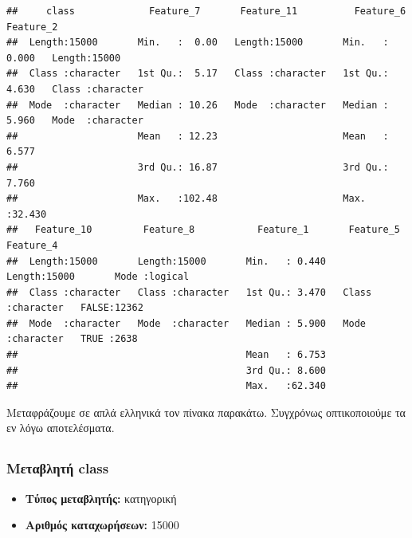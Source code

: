 \documentclass[
]{article}
\begin{document}
\begin{verbatim}
##     class             Feature_7       Feature_11          Feature_6       Feature_2        
##  Length:15000       Min.   :  0.00   Length:15000       Min.   : 0.000   Length:15000      
##  Class :character   1st Qu.:  5.17   Class :character   1st Qu.: 4.630   Class :character  
##  Mode  :character   Median : 10.26   Mode  :character   Median : 5.960   Mode  :character  
##                     Mean   : 12.23                      Mean   : 6.577                     
##                     3rd Qu.: 16.87                      3rd Qu.: 7.760                     
##                     Max.   :102.48                      Max.   :32.430                     
##   Feature_10         Feature_8           Feature_1       Feature_5         Feature_4      
##  Length:15000       Length:15000       Min.   : 0.440   Length:15000       Mode :logical  
##  Class :character   Class :character   1st Qu.: 3.470   Class :character   FALSE:12362    
##  Mode  :character   Mode  :character   Median : 5.900   Mode  :character   TRUE :2638     
##                                        Mean   : 6.753                                     
##                                        3rd Qu.: 8.600                                     
##                                        Max.   :62.340
\end{verbatim}

Μεταφράζουμε σε απλά ελληνικά τον πίνακα παρακάτω. Συγχρόνως
οπτικοποιούμε τα εν λόγω αποτελέσματα.

\subsection*{}\label{section}

\subsubsection*{Μεταβλητή
class}\label{ux3bcux3b5ux3c4ux3b1ux3b2ux3bbux3b7ux3c4ux3ae-class}

\begin{itemize}
\item
  \textbf{Τύπος μεταβλητής:} κατηγορική
\item
  \textbf{Αριθμός καταχωρήσεων:} 15000
\end{itemize}
\end{document}
